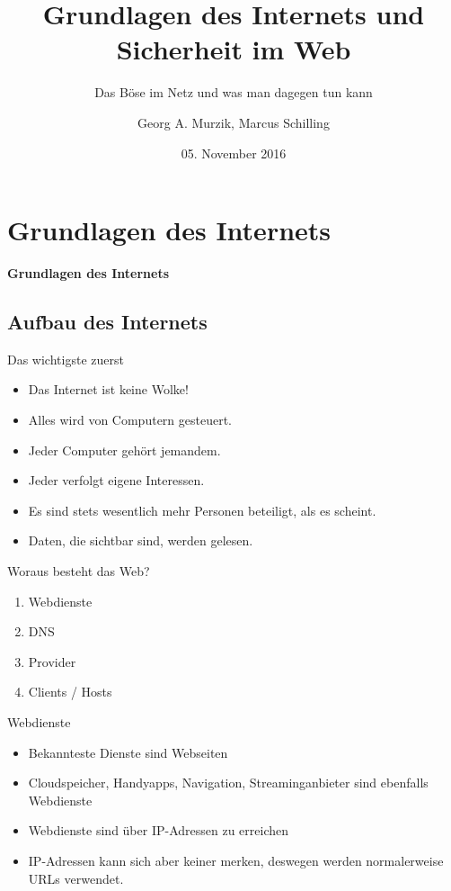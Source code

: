 \documentclass[hyperref={colorlinks,linkcolor=blue}, utf8]{beamer}
\title{Grundlagen des Internets und Sicherheit im Web}
\subtitle{Das Böse im Netz und was man dagegen tun kann} %
\author{Georg A. Murzik, Marcus Schilling}
\institute{Terminal.21}
\date{05. November 2016}
\begin{document}
	
	\begin{frame}
		\titlepage
	\end{frame}
	
	\section{Grundlagen des Internets}
	\begin{frame}
		\centering \huge \textbf{Grundlagen des Internets}
	\end{frame}
	
	\subsection{Aufbau des Internets}
	\begin{frame}{Das wichtigste zuerst}
		\begin{itemize}
			\item Das Internet ist keine Wolke!
			\item Alles wird von Computern gesteuert.
			\item Jeder Computer gehört jemandem.
			\item Jeder verfolgt eigene Interessen.
			\item Es sind stets wesentlich mehr Personen beteiligt, als es scheint.				\item Daten, die sichtbar sind, werden gelesen.	
		\end{itemize}		
	\end{frame}
	
	\begin{frame}{Woraus besteht das Web?}
		\begin{enumerate}
			\item Webdienste
			\item DNS
			\item Provider
			\item Clients / Hosts
		\end{enumerate}
	\end{frame}
		
	\begin{frame}{Webdienste}
		\begin{itemize}
			\item Bekannteste Dienste sind Webseiten
			\item Cloudspeicher, Handyapps, Navigation, Streaminganbieter sind ebenfalls Webdienste
			\item Webdienste sind über IP-Adressen zu erreichen
			\item IP-Adressen kann sich aber keiner merken, deswegen werden normalerweise URLs verwendet.
		\end{itemize}		
	\end{frame}
	
\end{document}
